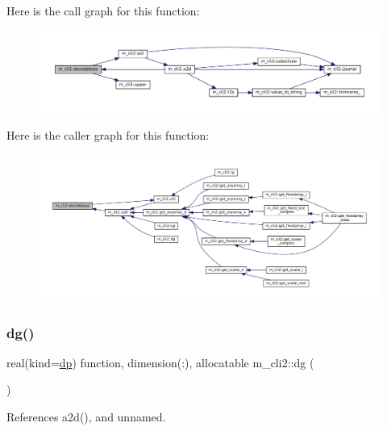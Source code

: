 Here is the call graph for this function\+:
\nopagebreak
\begin{figure}[H]
\begin{center}
\leavevmode
\includegraphics[width=350pt]{namespacem__cli2_a1029304d495b2bf791e03cfab5983bbb_cgraph}
\end{center}
\end{figure}
Here is the caller graph for this function\+:
\nopagebreak
\begin{figure}[H]
\begin{center}
\leavevmode
\includegraphics[width=350pt]{namespacem__cli2_a1029304d495b2bf791e03cfab5983bbb_icgraph}
\end{center}
\end{figure}
\mbox{\label{namespacem__cli2_a06ddc2533e5122b8f898bae7db0fea87}} 
\subsubsection{\texorpdfstring{dg()}{dg()}}
{\footnotesize\ttfamily real(kind=\mbox{\hyperlink{namespacem__cli2_acf83f1963cf6a56ad0221cfcf5402440}{dp}}) function, dimension(\+:), allocatable m\+\_\+cli2\+::dg (\begin{DoxyParamCaption}{ }\end{DoxyParamCaption})\hspace{0.3cm}{\ttfamily [private]}}



References a2d(), and unnamed.

